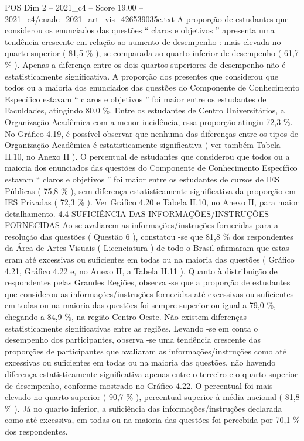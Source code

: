 \begin{textsample}{POS Dim 2 – 2021\_c4 – Score 19.00 – 2021\_c4/enade\_2021\_art\_vis\_426539035c.txt}
A proporção de estudantes que considerou os enunciados das questões “ claros e objetivos ” apresenta uma tendência crescente em relação ao aumento de desempenho : mais elevada no quarto superior ( 81,5 \% ), se comparada ao quarto inferior de desempenho ( 61,7 \% ).
Apenas a diferença entre os dois quartos superiores de desempenho não é estatisticamente significativa.
A proporção dos presentes que considerou que todos ou a maioria dos enunciados das questões do Componente de Conhecimento Específico estavam “ claros e objetivos ” foi maior entre os estudantes de Faculdades, atingindo 80,0 \%.
Entre os estudantes de Centro Universitários, a Organização Acadêmica com a menor incidência, essa proporção atingiu 72,3 \%.
No Gráfico 4.19, é possível observar que nenhuma das diferenças entre os tipos de Organização Acadêmica é estatisticamente significativa ( ver também Tabela II.10, no Anexo II ).
O percentual de estudantes que considerou que todos ou a maioria dos enunciados das questões do Componente de Conhecimento Específico estavam “ claros e objetivos ” foi maior entre os estudantes de cursos de IES Públicas ( 75,8 \% ), sem diferença estatisticamente significativa da proporção em IES Privadas ( 72,3 \% ).
Ver Gráfico 4.20 e Tabela II.10, no Anexo II, para maior detalhamento. 4.4 SUFICIÊNCIA DAS INFORMAÇÕES/INSTRUÇÕES FORNECIDAS Ao se avaliarem as informações/instruções fornecidas para a resolução das questões ( Questão 6 ), constatou -se que 81,8 \% dos respondentes da Área de Artes Visuais ( Licenciatura ) de todo o Brasil afirmaram que estas eram até excessivas ou suficientes em todas ou na maioria das questões ( Gráfico 4.21, Gráfico 4.22 e, no Anexo II, a Tabela II.11 ).
Quanto à distribuição de respondentes pelas Grandes Regiões, observa -se que a proporção de estudantes que considerou as informações/instruções fornecidas até excessivas ou suficientes em todas ou na maioria das questões foi sempre superior ou igual a 79,0 \%, chegando a 84,9 \%, na região Centro-Oeste.
Não existem diferenças estatisticamente significativas entre as regiões.
Levando -se em conta o desempenho dos participantes, observa -se uma tendência crescente das proporções de participantes que avaliaram as informações/instruções como até excessivas ou suficientes em todas ou na maioria das questões, não havendo diferença estatisticamente significativa apenas entre o terceiro e o quarto superior de desempenho, conforme mostrado no Gráfico 4.22.
O percentual foi mais elevado no quarto superior ( 90,7 \% ), percentual superior à média nacional ( 81,8 \% ).
Já no quarto inferior, a suficiência das informações/instruções declarada como até excessiva, em todas ou na maioria das questões foi percebida por 70,1 \% dos respondentes.

\end{textsample}

